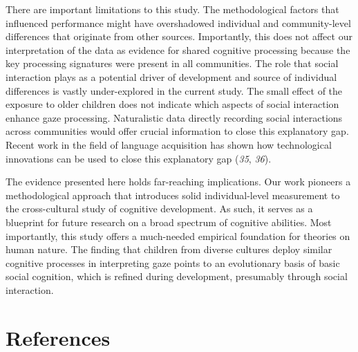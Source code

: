 \documentclass[
  man,floatsintext]{apa6}
\begin{document}
There are important limitations to this study. The methodological factors that influenced performance might have overshadowed individual and community-level differences that originate from other sources. Importantly, this does not affect our interpretation of the data as evidence for shared cognitive processing because the key processing signatures were present in all communities. The role that social interaction plays as a potential driver of development and source of individual differences is vastly under-explored in the current study. The small effect of the exposure to older children does not indicate which aspects of social interaction enhance gaze processing. Naturalistic data directly recording social interactions across communities would offer crucial information to close this explanatory gap. Recent work in the field of language acquisition has shown how technological innovations can be used to close this explanatory gap (\emph{35}, \emph{36}).

The evidence presented here holds far-reaching implications. Our work pioneers a methodological approach that introduces solid individual-level measurement to the cross-cultural study of cognitive development. As such, it serves as a blueprint for future research on a broad spectrum of cognitive abilities. Most importantly, this study offers a much-needed empirical foundation for theories on human nature. The finding that children from diverse cultures deploy similar cognitive processes in interpreting gaze points to an evolutionary basis of basic social cognition, which is refined during development, presumably through social interaction.

\newpage

\hypertarget{references}{%
\section{References}\label{references}}
\end{document}

